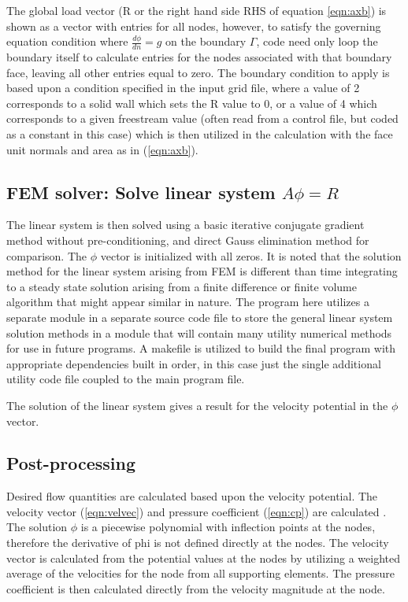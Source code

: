 \documentclass[conf]{new-aiaa}
\begin{document}
The global load vector (R or the right hand side RHS of equation \ref{eqn:axb}) is shown as a vector with entries for all nodes, however, to satisfy the governing equation condition where $\frac{d\phi}{dn}=g$ on the boundary $\Gamma$, code need only loop the boundary itself to calculate entries for the nodes associated with that boundary face, leaving all other entries equal to zero.  The boundary condition to apply is based upon a condition specified in the input grid file, where a value of 2 corresponds to a solid wall which sets the R value to 0, or a value of 4 which corresponds to a given freestream value (often read from a control file, but coded as a constant in this case) which is then utilized in the calculation with the face unit normals and area as in (\ref{eqn:axb}).

\subsection{FEM solver: Solve linear system $A\phi=R$}
\bigskip

The linear system is then solved using a basic iterative conjugate gradient method without pre-conditioning, and direct Gauss elimination method for comparison.  The $\phi$ vector is initialized with all zeros.  It is noted that the solution method for the linear system arising from FEM is different than time integrating to a steady state solution arising from a finite difference or finite volume algorithm that might appear similar in nature.  The program here utilizes a separate module in a separate source code file to store the general linear system solution methods in a module that will contain many utility numerical methods for use in future programs.  A makefile is utilized to build the final program with appropriate dependencies built in order, in this case just the single additional utility code file coupled to the main program file.

The solution of the linear system gives a result for the velocity potential in the $\phi$ vector.

\subsection{Post-processing}
\bigskip

Desired flow quantities are calculated based upon the velocity potential.  The velocity vector (\ref{eqn:velvec}) and pressure coefficient (\ref{eqn:cp}) are calculated \cite{luo}.  The solution $\phi$ is a piecewise polynomial with inflection points at the nodes, therefore the derivative of phi is not defined directly at the nodes.  The velocity vector is calculated from the potential values at the nodes by utilizing a weighted average of the velocities for the node from all supporting elements.  The pressure coefficient is then calculated directly from the velocity magnitude at the node.
\end{document}
